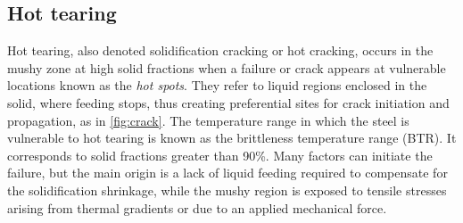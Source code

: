 \subsection*{Hot tearing} 
%
Hot tearing, also denoted solidification cracking or hot cracking, occurs in the mushy zone 
at high solid fractions when a failure or crack appears at vulnerable locations known as the \emph{hot spots}. 
They refer to liquid regions enclosed in the solid, where feeding stops, 
thus creating preferential sites for crack initiation and propagation, as in \cref{fig:crack}. 
The temperature range in which the steel is vulnerable to hot tearing is known as the brittleness 
temperature range (BTR). It corresponds to solid fractions greater than \num{90}\%.
Many factors can initiate the failure, but the main origin is a 
lack of liquid feeding required to compensate for the solidification shrinkage, while the mushy region
is exposed to tensile stresses arising from thermal gradients or due to an applied mechanical force.
